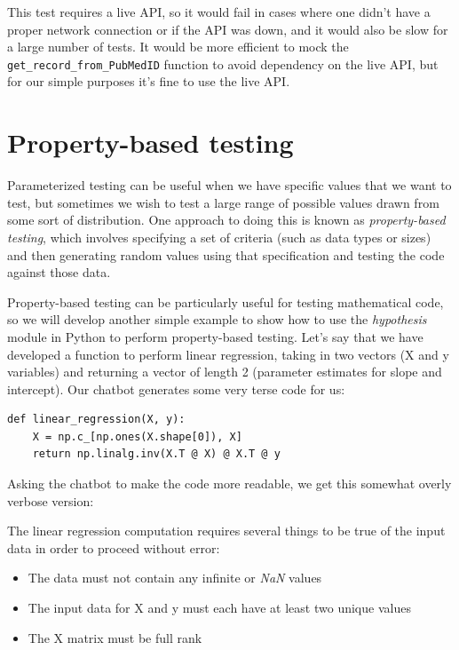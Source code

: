 

This test requires a live API, so it would fail in cases where one didn't have a proper network connection or if the API was down, and it would also be slow for a large number of tests.
It would be more efficient to mock the \texttt{get\_record\_from\_PubMedID} function to avoid dependency on the live API, but for our simple purposes it's fine to use the live API.

\section{Property-based testing}

Parameterized testing can be useful when we have specific values that we want to test, but sometimes we wish to test a large range of possible values drawn from some sort of distribution.
One approach to doing this is known as \textit{property-based testing}, which involves specifying a set of criteria (such as data types or sizes) and then generating random values using that specification and testing the code against those data.  

Property-based testing can be particularly useful for testing mathematical code, so we will develop another simple example to show how to use the \textit{hypothesis} module in Python to perform property-based testing.
Let's say that we have developed a function to perform linear regression, taking in two vectors (X and y variables) and returning a vector of length 2 (parameter estimates for slope and intercept).
Our chatbot generates some very terse code for us:

\begin{lstlisting}[style=Pythonshort]
def linear_regression(X, y):
    X = np.c_[np.ones(X.shape[0]), X]
    return np.linalg.inv(X.T @ X) @ X.T @ y
\end{lstlisting}

Asking the chatbot to make the code more readable, we get this somewhat overly verbose version:



The linear regression computation requires several things to be true of the input data in order to proceed without error:

\begin{itemize}
\item The data must not contain any infinite or \textit{NaN} values
\item The input data for X and y must each have at least two unique values
\item The X matrix must be full rank
\end{itemize}

